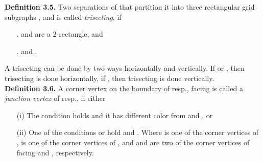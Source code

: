 \documentclass[preprint,12pt]{elsarticle}
\begin{document}
\noindent\textbf{Definition 3.5.} \cite{CST:AFAFCHPIM} Two
separations of  that partition it into three rectangular grid
subgraphs ,  and  is called
\textit{trisecting}, if
\begin{itemize}
\item[.]  and  are a 2-rectangle, and
\item[.]  and .
\end{itemize}

A trisecting can be done by two ways horizontally and vertically. If
 or , then trisecting is done
horizontally, if , then trisecting is done vertically. \\

\noindent\textbf{Definition 3.6.} A corner vertex on the boundary of
 resp.,  facing  is called a
\textit{junction vertex} of  resp.,  if
either
\begin{itemize}
\item [(i)] The condition  holds and it has different color from  and
, or
\item [(ii)] One of the conditions  or  hold and
.
Where  is one of the corner vertices of ,  is one of
the corner vertices of , and  and  are two of the
corner vertices of  facing  and ,
respectively.
\end{itemize}
\end{document}
